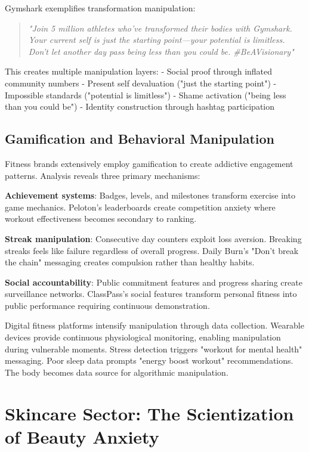 Gymshark exemplifies transformation manipulation:

\begin{quote}
\textit{"Join 5 million athletes who've transformed their bodies with Gymshark. Your current self is just the starting point—your potential is limitless. Don't let another day pass being less than you could be. \#BeAVisionary"}
\end{quote}

This creates multiple manipulation layers:
- Social proof through inflated community numbers
- Present self devaluation ("just the starting point")
- Impossible standards ("potential is limitless")
- Shame activation ("being less than you could be")
- Identity construction through hashtag participation

\subsection{Gamification and Behavioral Manipulation}

Fitness brands extensively employ gamification to create addictive engagement patterns. Analysis reveals three primary mechanisms:

\textbf{Achievement systems}: Badges, levels, and milestones transform exercise into game mechanics. Peloton's leaderboards create competition anxiety where workout effectiveness becomes secondary to ranking.

\textbf{Streak manipulation}: Consecutive day counters exploit loss aversion. Breaking streaks feels like failure regardless of overall progress. Daily Burn's "Don't break the chain" messaging creates compulsion rather than healthy habits.

\textbf{Social accountability}: Public commitment features and progress sharing create surveillance networks. ClassPass's social features transform personal fitness into public performance requiring continuous demonstration.

Digital fitness platforms intensify manipulation through data collection. Wearable devices provide continuous physiological monitoring, enabling manipulation during vulnerable moments. Stress detection triggers "workout for mental health" messaging. Poor sleep data prompts "energy boost workout" recommendations. The body becomes data source for algorithmic manipulation.

\section{Skincare Sector: The Scientization of Beauty Anxiety}
\label{sec:skincare_analysis}

